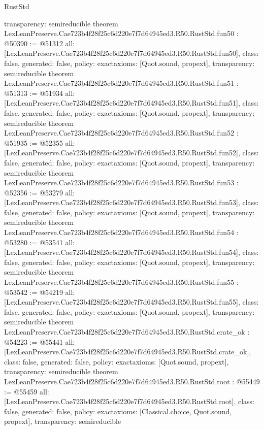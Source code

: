 \begin{lexlean}{RustStd}
\begin{coremodule}
{  transparency: semireducible
}
theorem LexLeanPreserve.Cae723b4f28f25c6d220e7f7d64945ed3.R50.RustStd.fun50 : @50390 := @51312 {
  all: [LexLeanPreserve.Cae723b4f28f25c6d220e7f7d64945ed3.R50.RustStd.fun50],
  class: false,
  generated: false,
  policy: exact{axioms: [Quot.sound, propext]},
  transparency: semireducible
}
theorem LexLeanPreserve.Cae723b4f28f25c6d220e7f7d64945ed3.R50.RustStd.fun51 : @51313 := @51934 {
  all: [LexLeanPreserve.Cae723b4f28f25c6d220e7f7d64945ed3.R50.RustStd.fun51],
  class: false,
  generated: false,
  policy: exact{axioms: [Quot.sound, propext]},
  transparency: semireducible
}
theorem LexLeanPreserve.Cae723b4f28f25c6d220e7f7d64945ed3.R50.RustStd.fun52 : @51935 := @52355 {
  all: [LexLeanPreserve.Cae723b4f28f25c6d220e7f7d64945ed3.R50.RustStd.fun52],
  class: false,
  generated: false,
  policy: exact{axioms: [Quot.sound, propext]},
  transparency: semireducible
}
theorem LexLeanPreserve.Cae723b4f28f25c6d220e7f7d64945ed3.R50.RustStd.fun53 : @52356 := @53279 {
  all: [LexLeanPreserve.Cae723b4f28f25c6d220e7f7d64945ed3.R50.RustStd.fun53],
  class: false,
  generated: false,
  policy: exact{axioms: [Quot.sound, propext]},
  transparency: semireducible
}
theorem LexLeanPreserve.Cae723b4f28f25c6d220e7f7d64945ed3.R50.RustStd.fun54 : @53280 := @53541 {
  all: [LexLeanPreserve.Cae723b4f28f25c6d220e7f7d64945ed3.R50.RustStd.fun54],
  class: false,
  generated: false,
  policy: exact{axioms: [Quot.sound, propext]},
  transparency: semireducible
}
theorem LexLeanPreserve.Cae723b4f28f25c6d220e7f7d64945ed3.R50.RustStd.fun55 : @53542 := @54219 {
  all: [LexLeanPreserve.Cae723b4f28f25c6d220e7f7d64945ed3.R50.RustStd.fun55],
  class: false,
  generated: false,
  policy: exact{axioms: [Quot.sound, propext]},
  transparency: semireducible
}
theorem LexLeanPreserve.Cae723b4f28f25c6d220e7f7d64945ed3.R50.RustStd.crate_ok : @54223 := @55441 {
  all: [LexLeanPreserve.Cae723b4f28f25c6d220e7f7d64945ed3.R50.RustStd.crate_ok],
  class: false,
  generated: false,
  policy: exact{axioms: [Quot.sound, propext]},
  transparency: semireducible
}
theorem LexLeanPreserve.Cae723b4f28f25c6d220e7f7d64945ed3.R50.RustStd.root : @55449 := @55459 {
  all: [LexLeanPreserve.Cae723b4f28f25c6d220e7f7d64945ed3.R50.RustStd.root],
  class: false,
  generated: false,
  policy: exact{axioms: [Classical.choice, Quot.sound, propext]},
  transparency: semireducible
}


\end{coremodule}
\end{lexlean}
